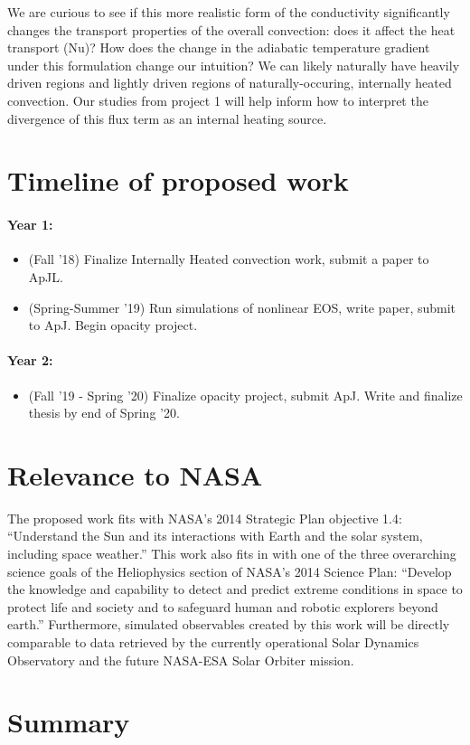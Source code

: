 \documentclass[aasms,12pt]{article}
\begin{document}
We are curious to see if this more realistic form of the conductivity significantly changes
the transport properties of the overall convection: does it affect the heat transport
(Nu)?  How does the change in the adiabatic temperature gradient under this formulation
change our intuition?  We can likely naturally have heavily driven regions and lightly
driven regions of naturally-occuring, internally heated convection.  Our studies from project
1 will help inform how to interpret the divergence of this flux term as an internal heating
source.

\section{Timeline of proposed work}
\paragraph{Year 1:}
\begin{itemize}
\item (Fall '18) Finalize Internally Heated convection work, submit a paper to ApJL.
\item (Spring-Summer '19) Run simulations of nonlinear EOS, write paper, submit to ApJ.
Begin opacity project.
\end{itemize}

\paragraph{Year 2:}
\begin{itemize}
\item (Fall '19 - Spring '20) Finalize opacity project, submit ApJ.  Write and
finalize thesis by end of Spring '20.
\end{itemize}

\newpage

\section{Relevance to NASA} 
The proposed work fits with NASA's 2014 Strategic Plan objective
1.4:
``Understand the Sun and its interactions with Earth and the solar
system, including space weather.''
This work also fits in with one of the three overarching science goals
of the Heliophysics section of NASA's 2014 Science Plan: 
``Develop the
knowledge and capability to detect and predict extreme conditions in space to
protect life and society and to safeguard human and robotic explorers beyond
earth.''  Furthermore, simulated observables created by this work will be
directly comparable to data retrieved by the currently operational Solar
Dynamics Observatory and the future NASA-ESA Solar Orbiter mission.

\section{Summary}




\begingroup
\renewcommand{\section}[2]{}%
\begin{footnotesize}

\end{footnotesize}
\endgroup
\end{document}
